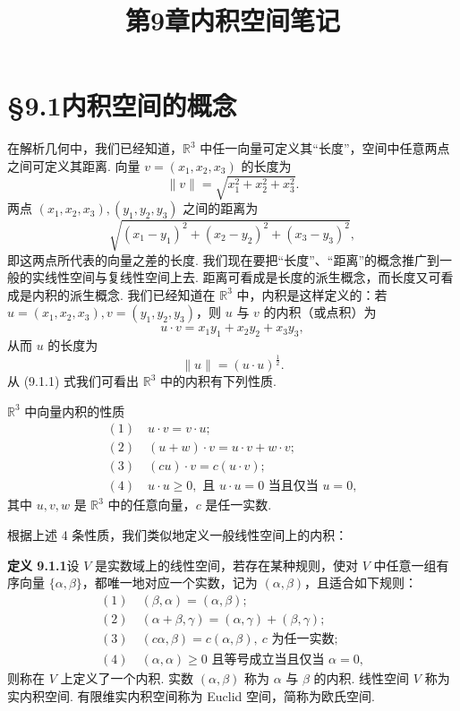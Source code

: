 \documentclass[UTF8,12pt,a4paper,fontset=fandol]{ctexart}
\title{第9章\quad 内积空间笔记}
\author{}
\date{}
\begin{document}
\maketitle

\section*{§9.1\quad 内积空间的概念}

在解析几何中，我们已经知道，$\mathbb R^3$ 中任一向量可定义其``长度''，空间中任意两点之间可定义其距离. 向量 $v=(x_1,x_2,x_3)$ 的长度为
\[
  \|v\|=\sqrt{x_1^2+x_2^2+x_3^2}.
\]
两点 $(x_1,x_2,x_3),(y_1,y_2,y_3)$ 之间的距离为
\[
  \sqrt{(x_1-y_1)^2+(x_2-y_2)^2+(x_3-y_3)^2},
\]
即这两点所代表的向量之差的长度. 我们现在要把``长度''、``距离''的概念推广到一般的实线性空间与复线性空间上去. 距离可看成是长度的派生概念，而长度又可看成是内积的派生概念. 我们已经知道在 $\mathbb R^3$ 中，内积是这样定义的：若 $u=(x_1,x_2,x_3),v=(y_1,y_2,y_3)$，则 $u$ 与 $v$ 的内积（或点积）为
\begin{equation}
  u\cdot v=x_1y_1+x_2y_2+x_3y_3,
  \tag{9.1.1}
\end{equation}
从而 $u$ 的长度为
\[
  \|u\|=(u\cdot u)^{\frac12}.
\]
从 (9.1.1) 式我们可看出 $\mathbb R^3$ 中的内积有下列性质.

$\mathbb R^3$ 中向量内积的性质
\[
\begin{gathered}
  (1)\quad u\cdot v=v\cdot u;\\
  (2)\quad (u+w)\cdot v=u\cdot v+w\cdot v;\\
  (3)\quad (cu)\cdot v=c(u\cdot v);\\
  (4)\quad u\cdot u\ge 0,\text{ 且 }u\cdot u=0\text{ 当且仅当 }u=0,
\end{gathered}
\]
其中 $u,v,w$ 是 $\mathbb R^3$ 中的任意向量，$c$ 是任一实数.

根据上述 4 条性质，我们类似地定义一般线性空间上的内积：

\noindent\textbf{定义 9.1.1}\quad 设 $V$ 是实数域上的线性空间，若存在某种规则，使对 $V$ 中任意一组有序向量 $\{\alpha,\beta\}$，都唯一地对应一个实数，记为 $(\alpha,\beta)$，且适合如下规则：
\[
\begin{gathered}
  (1)\quad (\beta,\alpha)=(\alpha,\beta);\\
  (2)\quad (\alpha+\beta,\gamma)=(\alpha,\gamma)+(\beta,\gamma);\\
  (3)\quad (c\alpha,\beta)=c(\alpha,\beta),\ c\text{ 为任一实数};\\
  (4)\quad (\alpha,\alpha)\ge0\text{ 且等号成立当且仅当 }\alpha=0,
\end{gathered}
\]
则称在 $V$ 上定义了一个内积. 实数 $(\alpha,\beta)$ 称为 $\alpha$ 与 $\beta$ 的内积. 线性空间 $V$ 称为实内积空间. 有限维实内积空间称为 Euclid 空间，简称为欧氏空间.
\end{document}
